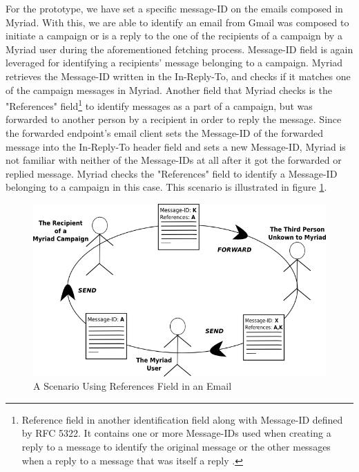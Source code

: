 For the prototype, we have set a specific message-ID on the emails composed in Myriad. With this, we are able to identify an email from Gmail was composed to initiate a campaign or is a reply to the one of the recipients of a campaign by a Myriad user during the aforementioned fetching process. Message-ID field is again leveraged for identifying a recipients' message belonging to a campaign. Myriad retrieves the Message-ID written in the In-Reply-To, and checks if it matches one of the campaign messages in Myriad. Another field that Myriad checks is the "References" field\footnote{Reference field in another identification field along with Message-ID defined by RFC 5322. It contains one or more Message-IDs used when creating a reply to a message to identify the original message or the other messages when a reply to a message that was itself a reply \citep{rfc5322}.} to identify messages as a part of a campaign, but was forwarded to another person by a recipient in order to reply the message. Since the forwarded endpoint's email client sets the Message-ID of the forwarded message into the In-Reply-To header field and sets a new Message-ID, Myriad is not familiar with neither of the Message-IDs at all after it got the forwarded or replied message. Myriad checks the "References" field to identify a Message-ID belonging to a campaign in this case. This scenario is illustrated in figure \ref{fig:drawingMessageReferences}.

\begin{figure}[htbp]
	\centering
	\includegraphics[width=1.00\textwidth]{imgs/drawingMessageReferences.png}
	\caption[A Scenario Using References Field in an Email]{A Scenario Using References Field in an Email}
	\label{fig:drawingMessageReferences}
\end{figure}

